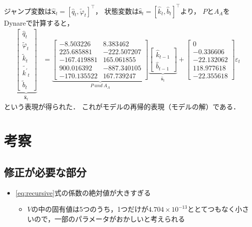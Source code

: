 \documentclass[dvipdfmx]{jlreq}
\begin{document}
ジャンプ変数は$\widehat{\boldsymbol{x}}_t = [\widehat{q}_t, \widetilde{\varphi}_t]^\top$，
状態変数は$\widehat{\boldsymbol{s}}_t = [\widehat{k}_t, \widehat{b}_t]^\top$より，
$P$と$A_A$をDynareで計算すると，
\begin{align} \label{eq:recursive}
  \underbrace{
    \begin{bmatrix}
      \widehat{q}_t\\
      \widetilde{\varphi}_t\\
      \widetilde{k}_t\\
      \widetilde{k^\prime}_t\\
      \widetilde{b}_t
    \end{bmatrix}
  }_{\widehat{\boldsymbol{x}}_t}
  &=
  \underbrace{
    \begin{bmatrix}
      -8.503226 & 8.383462\\
      225.685881 & -222.507207\\
      -167.419881 & 165.061855\\
      900.016392 & -887.340105\\
      -170.135522 & 167.739247
    \end{bmatrix}
  }_{P \ and \ A_A}
    \underbrace{
    \begin{bmatrix}
      \widehat{k}_{t-1}\\
      \widehat{b}_{t-1}
    \end{bmatrix}
  }_{\widehat{\boldsymbol{s}}_t}
  +
  \begin{bmatrix}
    0\\
    -0.336606\\
    -22.132062\\
    118.977618\\
    -22.355618
  \end{bmatrix}
  \varepsilon_t
\end{align}
という表現が得られた．
これがモデルの再帰的表現（モデルの解）である．

\section{考察}
\subsection*{修正が必要な部分}
\begin{itemize}
  \item \eqref{eq:recursive}式の係数の絶対値が大きすぎる
  \begin{itemize}
    \item $V$の中の固有値は5つのうち，1つだけが$4.704 \times 10^{-13}$ととてつもなく小さいので，一部のパラメータがおかしいと考えられる
  \end{itemize}
\end{itemize}
\end{document}
